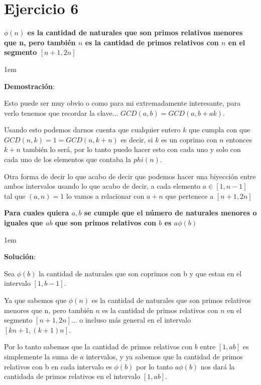 \documentclass[12pt, fleqn]{article}                             %
\newenvironment{SmallIndentation}[1][0.75em]                    %
    {\begin{adjustwidth}{#1}{}\begin{footnotesize}}                 %
    {\end{footnotesize}\end{adjustwidth}}                           %
\begin{document}
\section{Ejercicio 6}

    \textbf{$\phi(n)$ es la cantidad de naturales que son primos relativos menores que n, pero 
    también $n$ es la cantidad de primos relativos con $n$ en el segmento $[n+1, 2n]$}

        \begin{SmallIndentation}[1em]
            \textbf{Demostración}:
            
            Esto puede ser muy obvio o como para mi extremadamente interesante, para verlo
            tenemos que recordar la clave... $GCD(a,b) = GCD(a, b+ak)$.

            Usando esto podemos darnos cuenta que cualquier entero $k$ que cumpla con que
            $GCD(n, k) = 1 = GCD(n, k+n)$ es decir, si $k$ es un coprimo con $n$ entonces
            $k+n$ también lo será, por lo tanto puedo hacer esto con cada uno y solo con cada
            uno de los elementos que contaba la $phi(n)$.

            Otra forma de decir lo que acabo de decir que podemos hacer una biyección entre ambos
            intervalos usando lo que acabo de decir, a cada elemento $a \in [1, n-1]$ tal que $(a, n) = 1$
            lo vamos a relacionar con $a+n$ que pertenece a $[n+1, 2n]$
        
        \end{SmallIndentation}
            

    \textbf{Para cuales quiera $a, b$ se cumple que el número de naturales menores o iguales que $ab$
    que son primos relativos con $b$ es $a \phi(b)$}

    \begin{SmallIndentation}[1em]
        \textbf{Solución}:
        
        Sea $\phi(b)$ la cantidad de naturales que son coprimos con b y que estan en el intervalo
        $[1, b-1]$.

        Ya que sabemos que $\phi(n)$ es la cantidad de naturales que son primos relativos menores
        que n, pero también $n$ es la cantidad de primos relativos con $n$ en el
        segmento $[n+1, 2n]$... o incluso más general en el intervalo $[kn+1, (k+1)n]$.

        Por lo tanto sabemos que la cantidad de primos relativos con $b$ entre $[1, ab]$ es
        simplemente la suma de $a$ intervalos, y ya sabemos que la cantidad de primos relativos
        con b en cada intervalo es $\phi(b)$ por lo tanto $a\phi(b)$ nos dará la cantidada de
        primos relativos en el intervalo $[1, ab]$.
    
    \end{SmallIndentation}
\end{document}
